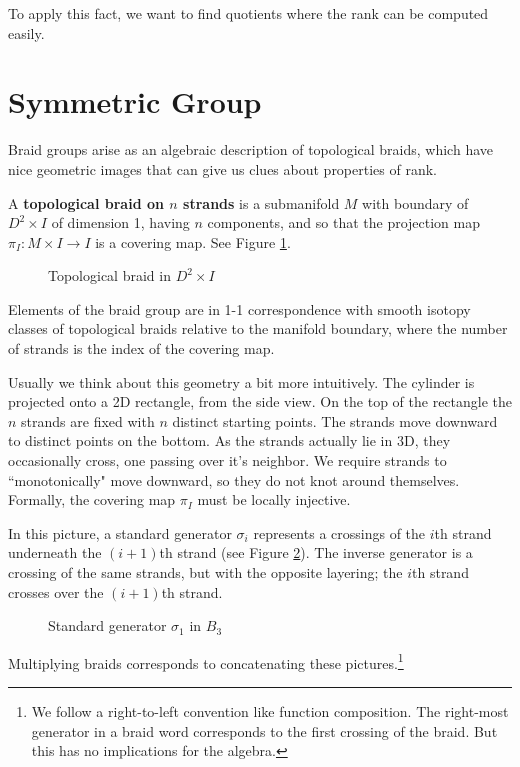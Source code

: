 \documentclass[12pt]{thesis}
\begin{document}
To apply this fact, we want to find quotients
where the rank can be computed easily.

\section{Symmetric Group}

\label{chap:symmetric-group}

Braid groups arise as an algebraic description of topological braids,
which have nice geometric images that can give us clues about properties of rank.
\begin{definition}
    A \textbf{topological braid on $n$ strands} is a submanifold $M$ with boundary of $D^{2} \times I$ of dimension 1, having $n$ components,
    and so that the projection map $\pi_{I} \colon M \times I \rightarrow I$
    is a covering map. See Figure \ref{fig:topological-braid}.
\end{definition}

\begin{figure}[h]
    \centering
    \def\svgwidth{10cm}
    
    \caption{Topological braid in $D^{2} \times I$}
    \label{fig:topological-braid}
\end{figure}

Elements of the braid group are in 1-1 correspondence with smooth isotopy classes of topological braids
relative to the manifold boundary,
where the number of strands is the index of the covering map.

Usually we think about this geometry a bit more intuitively.
The cylinder is projected onto a 2D 
rectangle, from the side view.
On the top of the rectangle
the $n$ strands are fixed with $n$ distinct starting points.
The strands move downward
to distinct points on the bottom.
As the strands actually lie in 3D,
they occasionally cross, one passing over it's neighbor.
We require strands to ``monotonically" move downward,
so they do not knot around themselves.
Formally, the covering map $\pi_{I}$ must be locally injective.

In this picture,
a standard generator $\sigma_{i}$ represents a crossings of the $i$th strand
underneath the $(i + 1)$th strand (see Figure \ref{fig:standard-generator}).
The inverse generator is a crossing of the same strands, but with the opposite layering;
the $i$th strand crosses over the $(i + 1)$th strand.
\begin{figure}[h]
    \centering
    \def\svgwidth{4cm}
    
    \caption{Standard generator $\sigma_{1}$ in $B_{3}$}
    \label{fig:standard-generator}
\end{figure}
Multiplying braids corresponds to concatenating these pictures.\footnote{We follow a right-to-left convention like function composition. The right-most generator
in a braid word corresponds to the first crossing of the braid.
But this has no implications for the algebra.}
\end{document}
